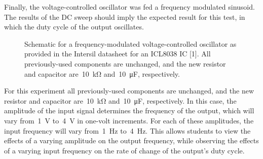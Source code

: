 Finally, the voltage-controlled oscillator was fed a frequency modulated
sinusoid.  The results of the DC sweep should imply the expected result for
this test, in which the duty cycle of the output oscillates.
%
\begin{figure}[H]
	\centering
	\parbox{.6\textwidth}{
	\caption{Schematic for a frequency-modulated voltage-controlled oscillator
	as provided in the Intersil datasheet for an ICL8038 IC [1].  All
	previously-used components are unchanged, and the new resistor and
	capacitor are~\SI{10}{\kilo\ohm} and~\SI{10}{\micro\farad}, respectively.}
	\label{fig:freq_mod}}
\end{figure}
%
For this experiment all previously-used components are unchanged, and the new
resistor and capacitor are~\SI{10}{\kilo\ohm} and~\SI{10}{\micro\farad},
respectively.  In this case, the amplitude of the input signal determines the
frequency of the output, which will vary from~\SI{1}{\volt} to~\SI{4}{\volt} in
one-volt increments.  For each of these amplitudes, the input frequency will
vary from~\SI{1}{\hertz} to~\SI{4}{\hertz}.  This allows students to view the
effects of a varying amplitude on the output frequency, while observing the
effects of a varying input frequency on the rate of change of the output's duty
cycle.
